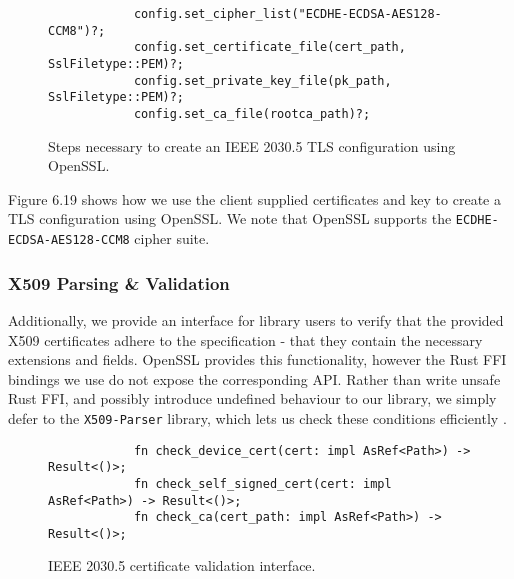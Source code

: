 \begin{figure}[h]
    \begin{center}
        \begin{lstlisting}
            config.set_cipher_list("ECDHE-ECDSA-AES128-CCM8")?;
            config.set_certificate_file(cert_path, SslFiletype::PEM)?;
            config.set_private_key_file(pk_path, SslFiletype::PEM)?;
            config.set_ca_file(rootca_path)?;
        \end{lstlisting}
        \label{fig:tlsconfigexample}
        \vspace{-10pt}
        \caption{Steps necessary to create an IEEE 2030.5 TLS configuration using OpenSSL.}
    \end{center}
\end{figure}

Figure 6.19 shows how we use the client supplied certificates and key to create a TLS configuration using OpenSSL. We note that OpenSSL supports the \texttt{ECDHE-ECDSA-AES128-CCM8} cipher suite.

\subsubsection{X509 Parsing \& Validation}
Additionally, we provide an interface for library users to verify that the provided X509 certificates adhere to the specification - that they contain the necessary extensions and fields. OpenSSL provides this functionality, however the Rust FFI bindings we use do not expose the corresponding API. Rather than write unsafe Rust FFI, and possibly introduce undefined behaviour to our library, we simply defer to the \texttt{X509-Parser} library, which lets us check these conditions efficiently \cite{x509parser}.

\begin{figure}[h]
    \begin{center}
        \begin{lstlisting}
            fn check_device_cert(cert: impl AsRef<Path>) -> Result<()>;
            fn check_self_signed_cert(cert: impl AsRef<Path>) -> Result<()>;
            fn check_ca(cert_path: impl AsRef<Path>) -> Result<()>;
        \end{lstlisting}
        \label{fig:certvalidinterface}
        \vspace{-10pt}
        \caption{IEEE 2030.5 certificate validation interface.}
    \end{center}
\end{figure}

